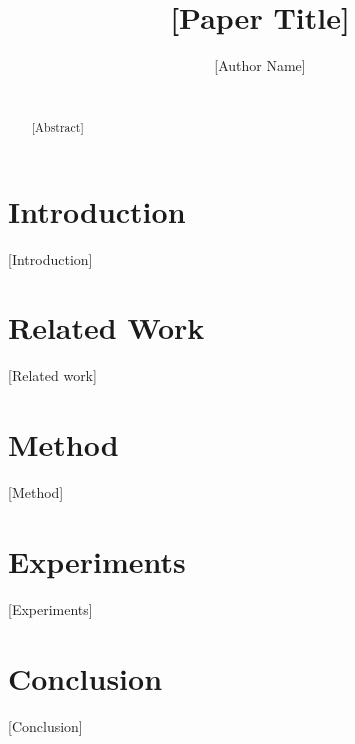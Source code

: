 \documentclass{article}
\title{[Paper Title]}
\author{[Author Name] \\
[Affiliation] \\
[Email]}
\begin{document}
\maketitle

\begin{abstract}
[Abstract]
\end{abstract}

\section{Introduction}
[Introduction]

\section{Related Work}
[Related work]

\section{Method}
[Method]

\section{Experiments}
[Experiments]

\section{Conclusion}
[Conclusion]



\end{document}
